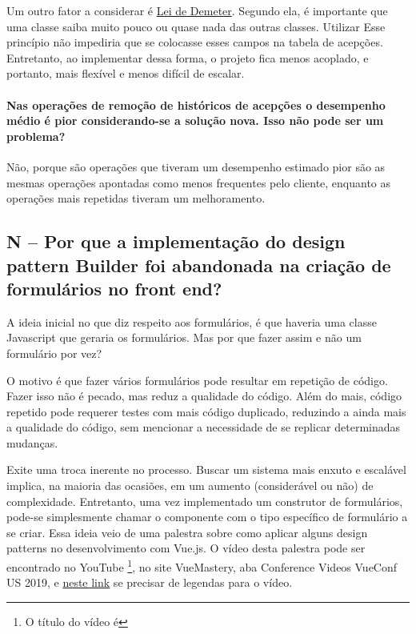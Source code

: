 Um outro fator a considerar é \href{https://pt.wikipedia.org/wiki/Lei_de_Demeter}{Lei de Demeter}. Segundo ela, é
importante que uma classe saiba muito pouco ou quase nada das outras classes. Utilizar Esse princípio não impediria
que se colocasse esses campos na tabela de acepções. Entretanto, ao implementar dessa forma, o projeto fica menos
acoplado, e portanto, mais flexível e menos difícil de escalar.

\paragraph{Nas operações de remoção de históricos de acepções o desempenho médio é pior considerando-se a solução
nova. Isso não pode ser um problema?}

Não, porque são operações que tiveram um desempenho estimado pior são as mesmas operações apontadas como
menos frequentes pelo cliente, enquanto as operações mais repetidas tiveram um melhoramento.

\subsection{N -- Por que a implementação do design pattern Builder foi abandonada na criação de formulários no front end?}
\label{subsec:nuxt-left-design-pattern-builder}

A ideia inicial no que diz respeito aos formulários, é que haveria uma classe Javascript que geraria os formulários. Mas
por que fazer assim e não um formulário por vez?

O motivo é que fazer vários formulários pode resultar em repetição de código. Fazer isso não é pecado, mas reduz
a qualidade do código. Além do mais, código repetido pode requerer testes com mais código duplicado, reduzindo a ainda
mais a qualidade do código, sem mencionar a necessidade de se replicar determinadas mudanças.

Exite uma troca inerente no processo. Buscar um sistema mais enxuto e escalável implica, na maioria das ocasiões, em um
aumento (considerável ou não) de complexidade. Entretanto, uma vez implementado um construtor de formulários, pode-se
simplesmente chamar o componente com o tipo específico de formulário a se criar. Essa ideia veio de uma palestra sobre
como aplicar alguns design patterns no desenvolvimento com Vue.js. O vídeo desta palestra pode ser encontrado no YouTube
\footnote{O título do vídeo é }, no site VueMastery, aba
Conference Videos \dir VueConf US 2019, e \href{https://read-and-watch.github.io/videos/RF1bbhRw9sg/index.html}{neste link}
se precisar de legendas para o vídeo.

